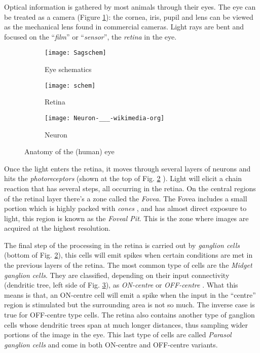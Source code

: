 Optical information is gathered by most animals through their eyes. 
The eye can be treated as a camera (Figure \ref{eye-schematics}): 
the cornea, iris, pupil and lens can be viewed as the mechanical 
lens found in commercial cameras. Light rays are bent and
focused on the ``\emph{film}'' or ``\emph{sensor}'',  
the \emph{retina} in the eye.
\begin{figure}[hbt]
    \centering
      \begin{subfigure}[b]{0.36\textwidth}
        \centering
        \texttt{[image: Sagschem]}
        \caption{Eye schematics}
        \label{eye-schematics}
      \end{subfigure}
      \begin{subfigure}[b]{0.32\textwidth}
          \centering
          \texttt{[image: schem]}
          \caption{Retina}
          \label{retinal-layers}
      \end{subfigure}
      \begin{subfigure}[b]{0.3\textwidth}
          \centering
          \texttt{[image: Neuron-\_\_\_-wikimedia-org]}
          \caption{Neuron}
          \label{neuron}
      \end{subfigure}
            
    \caption{Anatomy of the (human) eye }
    \label{basic-eye-anatomy}
\end{figure}


Once the light enters the retina, it moves through several layers 
of neurons \cite{webvision} and hits the \emph{photoreceptors} 
(shown at the top of Fig. \ref{retinal-layers} \cite{wiki-images}). Light will 
elicit a chain reaction that has several steps, all occurring in 
the retina. On the central regions of the retinal layer there's a zone
called the \emph{Fovea}. The Fovea includes a small 
portion which is highly packed 
with \emph{cones} \cite{webvision-midget}, and has almost direct 
exposure to light, this region is known as the \emph{Foveal Pit}. 
This is the zone where images are acquired at the highest resolution.

The final step of the processing in the retina is carried out by 
\emph{ganglion cells} (bottom of Fig. \ref{retinal-layers}), 
this cells will emit spikes when certain 
conditions are met in the previous layers of the retina. The most
common type of cells are the \emph{Midget ganglion cells}. They 
are classified, depending on their input connectivity (dendritic
tree, left side of Fig. \ref{neuron}), as \emph{ON-centre} or 
\emph{OFF-centre} \cite{basab-thesis, webvision-midget}. 
What this means is that, an ON-centre cell will emit a spike
when the input in the ``centre'' region is stimulated but the 
surrounding area is not so much. The inverse case is true for 
OFF-centre type cells. The retina also contains another type
of ganglion cells whose dendritic trees span at much longer
distances, thus sampling wider portions of the image in the eye.
This last type of cells are called \emph{Parasol ganglion cells}
and come in both ON-centre and OFF-centre variants.





